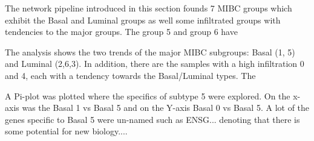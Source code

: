 The network pipeline introduced in this section founds 7 MIBC groups which exhibit the Basal and Luminal groups as well some infiltrated groups with tendencies to the major groups. The group 5 and group 6 have

The analysis shows the two trends of the major MIBC subgroups: Basal (1, 5) and Luminal (2,6,3). In addition, there are the samples with a high infiltration 0 and 4, each with a tendency towards the Basal/Luminal types. The 


A Pi-plot was plotted where the specifics of subtype 5 were explored. On the x-axis was the Basal 1 vs Basal 5 and on the Y-axis Basal 0 vs Basal 5. A lot of the genes specific to Basal 5 were un-named such as ENSG... denoting that there is some potential for new biology....






